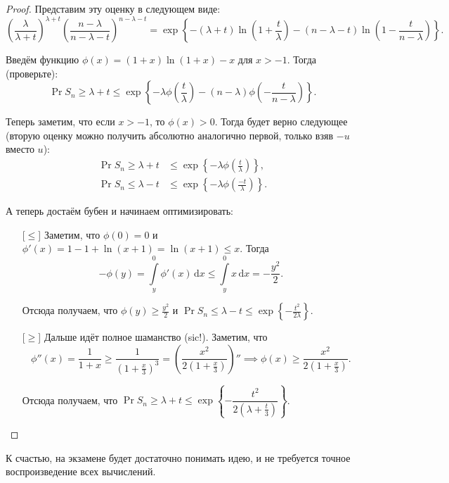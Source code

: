 \begin{proof}
    Представим эту оценку в следующем виде:
    \[\left(\frac{\lambda}{\lambda + t}\right)^{\lambda + t}\left(\frac{n - \lambda}{n - \lambda - t}\right)^{n - \lambda - t} = \exp\left\{-(\lambda + t)\ln\left(1 + \frac{t}{\lambda}\right) - (n - \lambda - t)\ln\left(1 - \frac{t}{n - \lambda}\right)\right\}.\]
    
    Введём функцию \(\phi(x) = (1 + x)\ln(1 + x) - x\) для \(x > -1\). Тогда (проверьте):
    \[\Pr{S_n \geq \lambda + t} \leq \exp\left\{-\lambda\phi\left(\frac{t}{\lambda}\right) - (n - \lambda)\phi\left(-\frac{t}{n - \lambda}\right)\right\}.\]
    
    Теперь заметим, что если \(x > -1\), то \(\phi(x) > 0\). Тогда будет верно следующее (вторую оценку можно получить абсолютно аналогично первой, только взяв \(-u\) вместо \(u\)):
    \[\begin{aligned}
    \Pr{S_n \geq \lambda + t} &\leq \exp\left\{-\lambda\phi\left(\frac{t}{\lambda}\right)\right\}, \\
    \Pr{S_n \leq \lambda - t} &\leq \exp\left\{-\lambda\phi\left(\frac{-t}{\lambda}\right)\right\}.
    \end{aligned}\]
    
    А теперь достаём бубен и начинаем оптимизировать:
    \begin{itemize}
        \item[{[\(\leq\)]}] Заметим, что \(\phi(0) = 0\) и \(\phi'(x) = 1 - 1 + \ln(x + 1) = \ln(x + 1) \leq x\). Тогда
        \[-\phi(y) = \int\limits_{y}^{0} \phi'(x)\,\mathrm{d}x \leq \int\limits_{y}^{0} x\,\mathrm{d}x = -\frac{y^2}{2}.\]
        
        Отсюда получаем, что \(\phi(y) \geq \frac{y^2}{2}\) и \(\Pr{S_n \leq \lambda - t} \leq \exp\left\{-\frac{t^2}{2\lambda}\right\}\).
        
        \item[{[\(\geq\)]}] Дальше идёт полное шаманство (sic!). Заметим, что 
        \[\phi''(x) = \frac{1}{1 + x} \geq \frac{1}{\left(1 + \frac{x}{3}\right)^3} = \left(\frac{x^2}{2\left(1 + \frac{x}{3}\right)}\right)'' \implies \phi(x) \geq \frac{x^2}{2\left(1 + \frac{x}{3}\right)}.\]
        
        Отсюда получаем, что \(\Pr{S_n \geq \lambda + t} \leq \exp\left\{-\dfrac{t^2}{2\left(\lambda + \frac{t}{3}\right)}\right\}\).
    \end{itemize}
\end{proof}


К счастью, на экзамене будет достаточно понимать идею, и не требуется точное воспроизведение всех 
вычислений.

